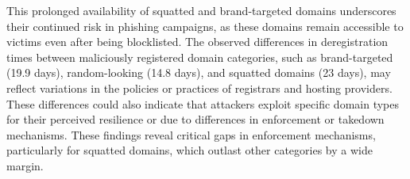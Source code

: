 This prolonged availability of squatted and brand-targeted domains underscores their continued risk in phishing campaigns, as these domains remain accessible to victims even after being blocklisted. The observed differences in deregistration times between maliciously registered domain categories, such as brand-targeted (19.9 days), random-looking (14.8 days), and squatted domains (23 days), may reflect variations in the policies or practices of registrars and hosting providers. 
These differences could also indicate that attackers exploit specific domain types for their perceived resilience or due to differences in enforcement or takedown mechanisms. 
These findings reveal critical gaps in enforcement mechanisms, particularly for squatted domains, which outlast other categories by a wide margin. 


\vspace{-5px}




